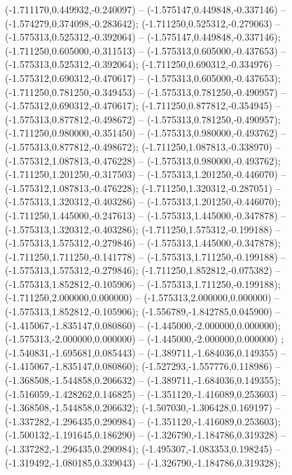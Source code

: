  (-1.711170,0.449932,-0.240097) -- (-1.575147,0.449848,-0.337146) -- (-1.574279,0.374098,-0.283642);
 (-1.711250,0.525312,-0.279063) -- (-1.575313,0.525312,-0.392064) -- (-1.575147,0.449848,-0.337146);
 (-1.711250,0.605000,-0.311513) -- (-1.575313,0.605000,-0.437653) -- (-1.575313,0.525312,-0.392064);
 (-1.711250,0.690312,-0.334976) -- (-1.575312,0.690312,-0.470617) -- (-1.575313,0.605000,-0.437653);
 (-1.711250,0.781250,-0.349453) -- (-1.575313,0.781250,-0.490957) -- (-1.575312,0.690312,-0.470617);
 (-1.711250,0.877812,-0.354945) -- (-1.575313,0.877812,-0.498672) -- (-1.575313,0.781250,-0.490957);
 (-1.711250,0.980000,-0.351450) -- (-1.575313,0.980000,-0.493762) -- (-1.575313,0.877812,-0.498672);
 (-1.711250,1.087813,-0.338970) -- (-1.575312,1.087813,-0.476228) -- (-1.575313,0.980000,-0.493762);
 (-1.711250,1.201250,-0.317503) -- (-1.575313,1.201250,-0.446070) -- (-1.575312,1.087813,-0.476228);
 (-1.711250,1.320312,-0.287051) -- (-1.575313,1.320312,-0.403286) -- (-1.575313,1.201250,-0.446070);
 (-1.711250,1.445000,-0.247613) -- (-1.575313,1.445000,-0.347878) -- (-1.575313,1.320312,-0.403286);
 (-1.711250,1.575312,-0.199188) -- (-1.575313,1.575312,-0.279846) -- (-1.575313,1.445000,-0.347878);
 (-1.711250,1.711250,-0.141778) -- (-1.575313,1.711250,-0.199188) -- (-1.575313,1.575312,-0.279846);
 (-1.711250,1.852812,-0.075382) -- (-1.575313,1.852812,-0.105906) -- (-1.575313,1.711250,-0.199188);
 (-1.711250,2.000000,0.000000) -- (-1.575313,2.000000,0.000000) -- (-1.575313,1.852812,-0.105906);
 (-1.556789,-1.842785,0.045900) -- (-1.415067,-1.835147,0.080860) -- (-1.445000,-2.000000,0.000000);
 (-1.575313,-2.000000,0.000000) -- (-1.445000,-2.000000,0.000000) ;
 (-1.540831,-1.695681,0.085443) -- (-1.389711,-1.684036,0.149355) -- (-1.415067,-1.835147,0.080860);
 (-1.527293,-1.557776,0.118986) -- (-1.368508,-1.544858,0.206632) -- (-1.389711,-1.684036,0.149355);
 (-1.516059,-1.428262,0.146825) -- (-1.351120,-1.416089,0.253603) -- (-1.368508,-1.544858,0.206632);
 (-1.507030,-1.306428,0.169197) -- (-1.337282,-1.296435,0.290984) -- (-1.351120,-1.416089,0.253603);
 (-1.500132,-1.191645,0.186290) -- (-1.326790,-1.184786,0.319328) -- (-1.337282,-1.296435,0.290984);
 (-1.495307,-1.083353,0.198245) -- (-1.319492,-1.080185,0.339043) -- (-1.326790,-1.184786,0.319328);

